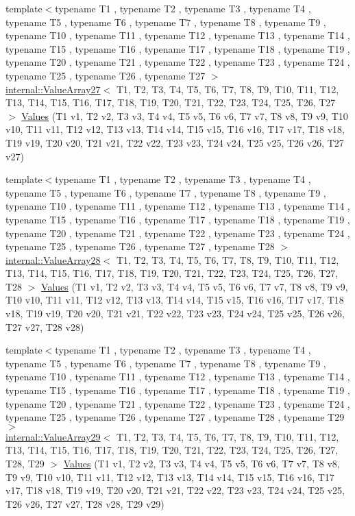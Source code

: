 \begin{DoxyCompactItemize}
\item 
{\footnotesize template$<$typename T1 , typename T2 , typename T3 , typename T4 , typename T5 , typename T6 , typename T7 , typename T8 , typename T9 , typename T10 , typename T11 , typename T12 , typename T13 , typename T14 , typename T15 , typename T16 , typename T17 , typename T18 , typename T19 , typename T20 , typename T21 , typename T22 , typename T23 , typename T24 , typename T25 , typename T26 , typename T27 $>$ }\\\mbox{\hyperlink{classtesting_1_1internal_1_1_value_array27}{internal\+::\+Value\+Array27}}$<$ T1, T2, T3, T4, T5, T6, T7, T8, T9, T10, T11, T12, T13, T14, T15, T16, T17, T18, T19, T20, T21, T22, T23, T24, T25, T26, T27 $>$ \mbox{\hyperlink{namespacetesting_a089ea706f6cdde715d03ab42aa3099d3}{Values}} (T1 v1, T2 v2, T3 v3, T4 v4, T5 v5, T6 v6, T7 v7, T8 v8, T9 v9, T10 v10, T11 v11, T12 v12, T13 v13, T14 v14, T15 v15, T16 v16, T17 v17, T18 v18, T19 v19, T20 v20, T21 v21, T22 v22, T23 v23, T24 v24, T25 v25, T26 v26, T27 v27)
\item 
{\footnotesize template$<$typename T1 , typename T2 , typename T3 , typename T4 , typename T5 , typename T6 , typename T7 , typename T8 , typename T9 , typename T10 , typename T11 , typename T12 , typename T13 , typename T14 , typename T15 , typename T16 , typename T17 , typename T18 , typename T19 , typename T20 , typename T21 , typename T22 , typename T23 , typename T24 , typename T25 , typename T26 , typename T27 , typename T28 $>$ }\\\mbox{\hyperlink{classtesting_1_1internal_1_1_value_array28}{internal\+::\+Value\+Array28}}$<$ T1, T2, T3, T4, T5, T6, T7, T8, T9, T10, T11, T12, T13, T14, T15, T16, T17, T18, T19, T20, T21, T22, T23, T24, T25, T26, T27, T28 $>$ \mbox{\hyperlink{namespacetesting_a5785254e0510108d9d422e32ba18f170}{Values}} (T1 v1, T2 v2, T3 v3, T4 v4, T5 v5, T6 v6, T7 v7, T8 v8, T9 v9, T10 v10, T11 v11, T12 v12, T13 v13, T14 v14, T15 v15, T16 v16, T17 v17, T18 v18, T19 v19, T20 v20, T21 v21, T22 v22, T23 v23, T24 v24, T25 v25, T26 v26, T27 v27, T28 v28)
\item 
{\footnotesize template$<$typename T1 , typename T2 , typename T3 , typename T4 , typename T5 , typename T6 , typename T7 , typename T8 , typename T9 , typename T10 , typename T11 , typename T12 , typename T13 , typename T14 , typename T15 , typename T16 , typename T17 , typename T18 , typename T19 , typename T20 , typename T21 , typename T22 , typename T23 , typename T24 , typename T25 , typename T26 , typename T27 , typename T28 , typename T29 $>$ }\\\mbox{\hyperlink{classtesting_1_1internal_1_1_value_array29}{internal\+::\+Value\+Array29}}$<$ T1, T2, T3, T4, T5, T6, T7, T8, T9, T10, T11, T12, T13, T14, T15, T16, T17, T18, T19, T20, T21, T22, T23, T24, T25, T26, T27, T28, T29 $>$ \mbox{\hyperlink{namespacetesting_a3d8a9bd3f027d89ff2873e3f0ff396cb}{Values}} (T1 v1, T2 v2, T3 v3, T4 v4, T5 v5, T6 v6, T7 v7, T8 v8, T9 v9, T10 v10, T11 v11, T12 v12, T13 v13, T14 v14, T15 v15, T16 v16, T17 v17, T18 v18, T19 v19, T20 v20, T21 v21, T22 v22, T23 v23, T24 v24, T25 v25, T26 v26, T27 v27, T28 v28, T29 v29)

\end{DoxyCompactItemize}
